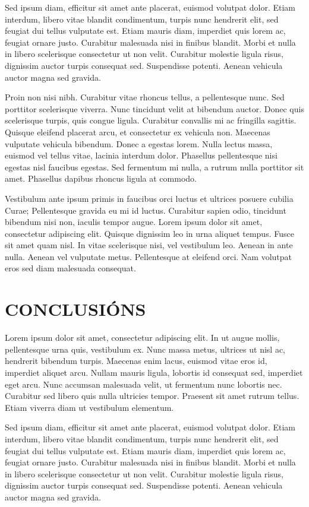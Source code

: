 \documentclass{pfc}
\begin{document}
Sed ipsum diam, efficitur sit amet ante placerat, euismod volutpat
dolor. Etiam interdum, libero vitae blandit condimentum, turpis nunc
hendrerit elit, sed feugiat dui tellus vulputate est. Etiam mauris
diam, imperdiet quis lorem ac, feugiat ornare justo. Curabitur
malesuada nisi in finibus blandit. Morbi et nulla in libero
scelerisque consectetur ut non velit. Curabitur molestie ligula risus,
dignissim auctor turpis consequat sed. Suspendisse potenti. Aenean
vehicula auctor magna sed gravida.

Proin non nisi nibh. Curabitur vitae rhoncus tellus, a pellentesque
nunc. Sed porttitor scelerisque viverra. Nunc tincidunt velit at
bibendum auctor. Donec quis scelerisque turpis, quis congue
ligula. Curabitur convallis mi ac fringilla sagittis. Quisque eleifend
placerat arcu, et consectetur ex vehicula non. Maecenas vulputate
vehicula bibendum. Donec a egestas lorem. Nulla lectus massa, euismod
vel tellus vitae, lacinia interdum dolor. Phasellus pellentesque nisi
egestas nisl faucibus egestas. Sed fermentum mi nulla, a rutrum nulla
porttitor sit amet. Phasellus dapibus rhoncus ligula at commodo.

Vestibulum ante ipsum primis in faucibus orci luctus et ultrices
posuere cubilia Curae; Pellentesque gravida eu mi id luctus. Curabitur
sapien odio, tincidunt bibendum nisi non, iaculis tempor augue. Lorem
ipsum dolor sit amet, consectetur adipiscing elit. Quisque dignissim
leo in urna aliquet tempus. Fusce sit amet quam nisl. In vitae
scelerisque nisi, vel vestibulum leo. Aenean in ante nulla. Aenean vel
vulputate metus. Pellentesque at eleifend orci. Nam volutpat eros sed
diam malesuada consequat.



\chapter{CONCLUSIÓNS}
\label{chap:conclu}

Lorem ipsum dolor sit amet, consectetur adipiscing elit. In ut augue
mollis, pellentesque urna quis, vestibulum ex. Nunc massa metus,
ultrices ut nisl ac, hendrerit bibendum turpis. Maecenas enim lacus,
euismod vitae eros id, imperdiet aliquet arcu. Nullam mauris ligula,
lobortis id consequat sed, imperdiet eget arcu. Nunc accumsan
malesuada velit, ut fermentum nunc lobortis nec. Curabitur sed libero
quis nulla ultricies tempor. Praesent sit amet rutrum tellus. Etiam
viverra diam ut vestibulum elementum.

Sed ipsum diam, efficitur sit amet ante placerat, euismod volutpat
dolor. Etiam interdum, libero vitae blandit condimentum, turpis nunc
hendrerit elit, sed feugiat dui tellus vulputate est. Etiam mauris
diam, imperdiet quis lorem ac, feugiat ornare justo. Curabitur
malesuada nisi in finibus blandit. Morbi et nulla in libero
scelerisque consectetur ut non velit. Curabitur molestie ligula risus,
dignissim auctor turpis consequat sed. Suspendisse potenti. Aenean
vehicula auctor magna sed gravida.
\end{document}
